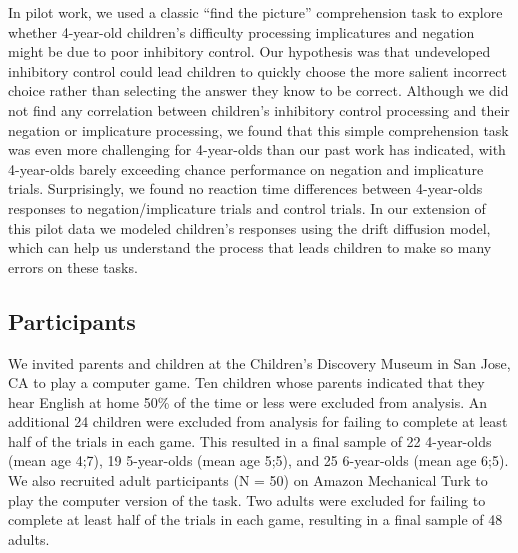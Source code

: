 \documentclass[10pt,letterpaper]{article}
\begin{document}
In pilot work, we used a classic ``find the picture'' comprehension task to explore whether 4-year-old children's difficulty processing implicatures and negation might be due to poor inhibitory control.  Our hypothesis was that undeveloped inhibitory control could lead children to quickly choose the more salient incorrect choice rather than selecting the answer they know to be correct.  Although we did not find any correlation between children's inhibitory control processing and their negation or implicature processing, we found that this simple comprehension task was even more challenging for 4-year-olds than our past work has indicated, with 4-year-olds barely exceeding chance performance on negation and implicature trials.  Surprisingly, we found no reaction time differences between 4-year-olds responses to negation/implicature trials and control trials. In our extension of this pilot data we modeled children's responses using the drift diffusion model, which can help us understand the process that leads children to make so many errors on these tasks.  

\subsection{Participants}

We invited parents and children at the Children's Discovery Museum in San Jose, CA to play a computer game.  Ten children whose parents indicated that they hear English at home 50\% of the time or less were excluded from analysis.  An additional 24 children were excluded from analysis for failing to complete at least half of the trials in each game.  This resulted in a final sample of 22 4-year-olds (mean age 4;7), 19 5-year-olds (mean age 5;5), and 25 6-year-olds (mean age 6;5).  We also recruited adult participants (N = 50) on Amazon Mechanical Turk to play the computer version of the task.  Two adults were excluded for failing to complete at least half of the trials in each game, resulting in a final sample of 48 adults.  
\end{document}
